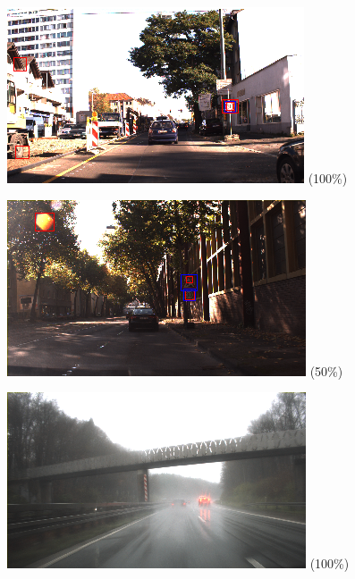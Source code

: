 \documentclass[12pt,a4paper,bibliography=totocnumbered,listof=totocnumbered]{scrartcl}
\begin{document}
\begin{figure}[H]
\begin{minipage}{0.3\textwidth}
\centering
\includegraphics[width=\linewidth]{train0_predboxes2.png}
\small{(100\%)}
\end{minipage}
\hfill
\begin{minipage}{0.3\textwidth}
\centering
\includegraphics[width=\linewidth]{train23_predboxes2.png}
\small{(50\%)}
\end{minipage}
\hfill
\begin{minipage}{0.3\textwidth}
\centering
\includegraphics[width=\linewidth]{train212_predboxes2.png}
\small{(100\%)}
\end{minipage}


\end{figure}
\end{document}
